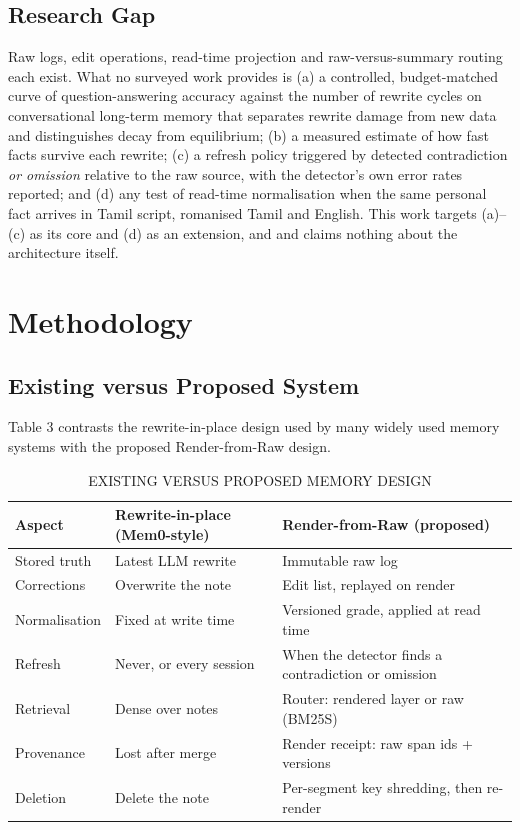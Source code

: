 \subsection{Research Gap}
Raw logs, edit operations, read-time projection and raw-versus-summary routing each exist. What no surveyed work provides is (a) a controlled, budget-matched curve of question-answering accuracy against the number of rewrite cycles on conversational long-term memory that separates rewrite damage from new data and distinguishes decay from equilibrium; (b) a measured estimate of how fast facts survive each rewrite; (c) a refresh policy triggered by detected contradiction \textit{or omission} relative to the raw source, with the detector's own error rates reported; and (d) any test of read-time normalisation when the same personal fact arrives in Tamil script, romanised Tamil and English. This work targets (a)--(c) as its core and (d) as an extension, and and claims nothing about the architecture itself.

\section{Methodology}

\subsection{Existing versus Proposed System}
Table 3 contrasts the rewrite-in-place design used by many widely used memory systems with the proposed Render-from-Raw design.

\begin{table}[!htb]
\centering
\caption{EXISTING VERSUS PROPOSED MEMORY DESIGN}
\footnotesize\renewcommand{\arraystretch}{1.18}
\begin{tabularx}{\columnwidth}{|p{1.8cm}|X|X|}
\hline
\textbf{Aspect} & \textbf{Rewrite-in-place (Mem0-style)} & \textbf{Render-from-Raw (proposed)} \\ \hline
Stored truth & Latest LLM rewrite & Immutable raw log \\ \hline
Corrections & Overwrite the note & Edit list, replayed on render \\ \hline
Normalisation & Fixed at write time & Versioned grade, applied at read time \\ \hline
Refresh & Never, or every session & When the detector finds a contradiction or omission \\ \hline
Retrieval & Dense over notes & Router: rendered layer or raw (BM25S) \\ \hline
Provenance & Lost after merge & Render receipt: raw span ids + versions \\ \hline
Deletion & Delete the note & Per-segment key shredding, then re-render \\ \hline
\end{tabularx}
\end{table}

